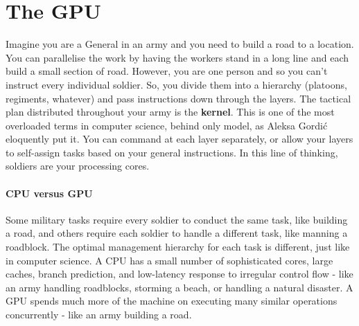 \section{The GPU}
\label{sec:hardware-one-gpu}

Imagine you are a General in an army and you need to build a road to a location.
You can parallelise the work by having the workers stand in a long line and each build a small section of road.
However, you are one person and so you can't instruct every individual soldier. 
So, you divide them into a hierarchy (platoons, regiments, whatever) and pass instructions down through the layers. 
The tactical plan distributed throughout your army is the \textbf{kernel}.
This is one of the most overloaded terms in computer science, behind only model, as Aleksa Gordić eloquently put it.
You can command at each layer separately, or allow your layers to self-assign tasks based on your general instructions.
In this line of thinking, soldiers are your processing cores.

\paragraph{CPU versus GPU}
Some military tasks require every soldier to conduct the same task, like building a road, and others require each soldier to handle a different task, like manning a roadblock.
The optimal management hierarchy for each task is different, just like in computer science. 
A CPU has a small number of sophisticated cores, large caches, branch prediction, and low-latency response to irregular control flow - like an army handling roadblocks, storming a beach, or handling a natural disaster.
A GPU spends much more of the machine on executing many similar operations concurrently - like an army building a road.


